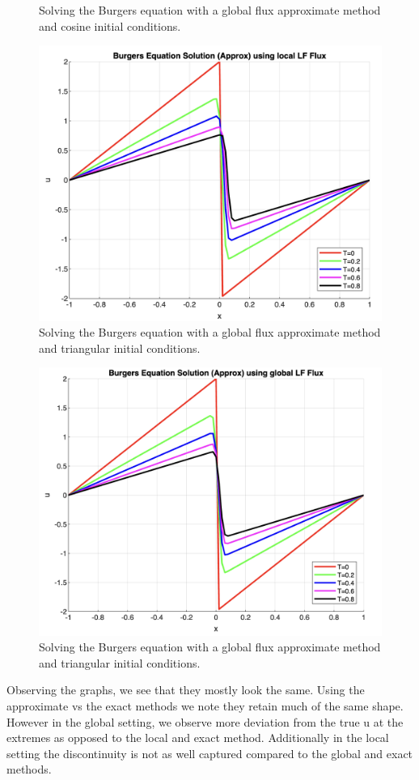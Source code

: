 \begin{solution}
\begin{figure}[H]
    \caption{Solving the Burgers equation with a global flux approximate method and cosine initial conditions.}
\end{figure}
\begin{figure}[H]
    \centering
    \includegraphics[scale=0.4]{./figures/q6-triangular-local.png}
    \caption{Solving the Burgers equation with a global flux approximate method and triangular initial conditions.}
\end{figure}
\begin{figure}[H]
    \centering
    \includegraphics[scale=0.4]{./figures/q6-triangular-global.png}
    \caption{Solving the Burgers equation with a global flux approximate method and triangular initial conditions.}
\end{figure}
Observing the graphs, we see that they mostly look the same. Using the approximate vs the exact methods we note they retain much of the same shape. However in the global setting, we observe more deviation from the true u at the extremes as opposed to the local and exact method. Additionally in the local setting the discontinuity is not as well captured compared to the global and exact methods.
\end{solution}


